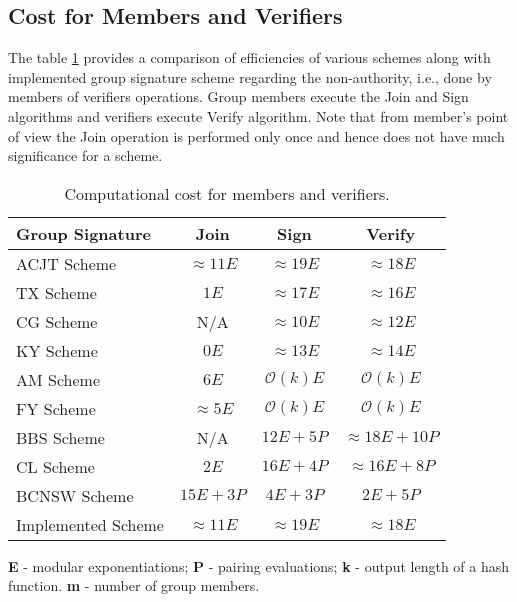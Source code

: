 \subsection{Cost for Members and Verifiers}
The table \ref{table:Computational complexity for group members and verifiers} provides a comparison of efficiencies of various schemes along with implemented group signature scheme regarding the non-authority, i.e., done by members of verifiers operations. Group members execute the Join and Sign algorithms and verifiers execute Verify algorithm. Note that from member’s point of view the Join operation is performed only once and hence does not have much significance for a scheme.
\begin{table}[!h]
\begin{center}
\begin{threeparttable}
\renewcommand{\arraystretch}{1.3}
\caption{Computational cost for members and verifiers.}
\label{table:Computational complexity for group members and verifiers}
\begin{tabular}{| l | c | c | c |}
\hline 
\textbf{Group Signature} & \textbf{Join} & \textbf{Sign} & \textbf{Verify} \\
\hline\hline

ACJT Scheme		  & $\approx 11E$& $\approx 19E$    & $\approx 18E$ 		\\ \hline
TX Scheme		  & $1E$		 & $\approx 17E$	& $\approx 16E$ 		\\ \hline
CG Scheme  		  & N/A			 & $\approx 10E$    & $\approx 12E$ 		\\ \hline
KY Scheme  		  & $0E$		 & $\approx 13E$    & $\approx 14E$ 		\\ \hline\hline
AM Scheme  		  & $6E$ 	 	 & $\mathcal{O}(k)E$& $\mathcal{O}(k)E$	    \\ \hline
FY Scheme  		  & $\approx 5E$ & $\mathcal{O}(k)E$& $\mathcal{O}(k)E$	    \\ \hline\hline
BBS Scheme		  & N/A			 & $12E + 5P$       & $\approx 18E + 10P$	\\ \hline
CL Scheme		  & $2E$ 	 	 & $16E + 4P$	    & $\approx 16E + 8P$ 	\\ \hline
BCNSW Scheme	  & $15E + 3P$ 	 & $4E+ 3P$ 	    & $2E + 5P$   	 	    \\ \hline\hline
Implemented Scheme& $\approx 11E$& $\approx 19E$    & $\approx 18E$ 		\\ \hline

\end{tabular}
\begin{tablenotes}\footnotesize
\item \textbf{E} - modular exponentiations; \textbf{P} - pairing evaluations; \textbf{k} - output length of a hash function. \textbf{m} - number of group members.
\end{tablenotes}
\end{threeparttable}
\end{center}
\end{table}

